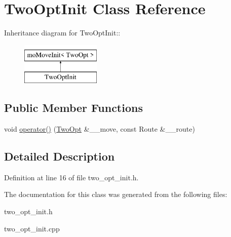 \hypertarget{classTwoOptInit}{
\section{Two\-Opt\-Init Class Reference}
\label{classTwoOptInit}
}
Inheritance diagram for Two\-Opt\-Init::\begin{figure}[H]
\begin{center}
\leavevmode
\includegraphics[height=2cm]{classTwoOptInit}
\end{center}
\end{figure}
\subsection*{Public Member Functions}
\begin{CompactItemize}
\item 
\hypertarget{classTwoOptInit_5bf6af064d37ebd955ffb5a623e78e1b}{
void \hyperlink{classTwoOptInit_5bf6af064d37ebd955ffb5a623e78e1b}{operator()} (\hyperlink{classTwoOpt}{Two\-Opt} \&\_\-\_\-move, const Route \&\_\-\_\-route)}
\label{classTwoOptInit_5bf6af064d37ebd955ffb5a623e78e1b}

\end{CompactItemize}


\subsection{Detailed Description}




Definition at line 16 of file two\_\-opt\_\-init.h.

The documentation for this class was generated from the following files:\begin{CompactItemize}
\item 
two\_\-opt\_\-init.h\item 
two\_\-opt\_\-init.cpp\end{CompactItemize}
